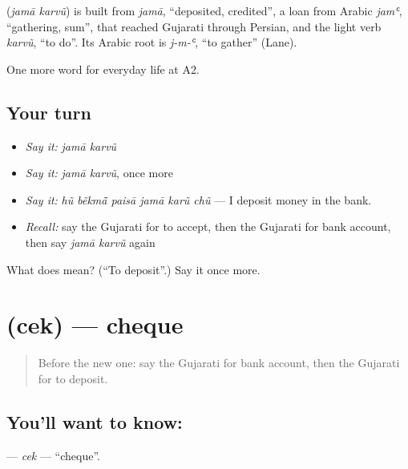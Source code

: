 \begin{cousinweb}
\textbf{ } (\emph{jamā karvũ}) is built from \emph{jamā}, \textquotedblleft{}deposited, credited\textquotedblright{}, a loan from Arabic \emph{jamʿ}, \textquotedblleft{}gathering, sum\textquotedblright{}, that reached Gujarati through Persian, and the light verb \emph{karvũ}, \textquotedblleft{}to do\textquotedblright{}. Its Arabic root is \emph{j-m-ʿ}, \textquotedblleft{}to gather\textquotedblright{} (Lane).
\end{cousinweb}

\begin{grammarlens}[title={What you've built}]
One more word for everyday life at A2.
\end{grammarlens}

\subsection*{Your turn}
\begin{itemize}
\raggedright
  \item \emph{Say it:} \emph{jamā karvũ}
  \item \emph{Say it:} \emph{jamā karvũ}, once more
  \item \emph{Say it:} \emph{hũ bẽkmā̃ paisā jamā karũ chũ} — I deposit money in the bank.
  \item \emph{Recall:} say the Gujarati for to accept, then the Gujarati for bank account, then say \emph{jamā karvũ} again
\end{itemize}

\begin{tcolorbox}[breakable,colback=teal!4,colframe=teal!35!black,title={Before you move on}]
What does   mean? (\textquotedblleft{}To deposit\textquotedblright{}.) Say it once more.
\end{tcolorbox}
\section[\texorpdfstring{\gu{ચેક} (cek)}{ચેક (cek)}]{ (cek) — cheque}

\label{lesson:GU-C190-cek}



\begin{quote}
Before the new one: say the Gujarati for bank account, then the Gujarati for to deposit.
\end{quote}

\subsection*{You'll want to know: }
\textbf{} — \emph{cek} — \textquotedblleft{}cheque\textquotedblright{}.


